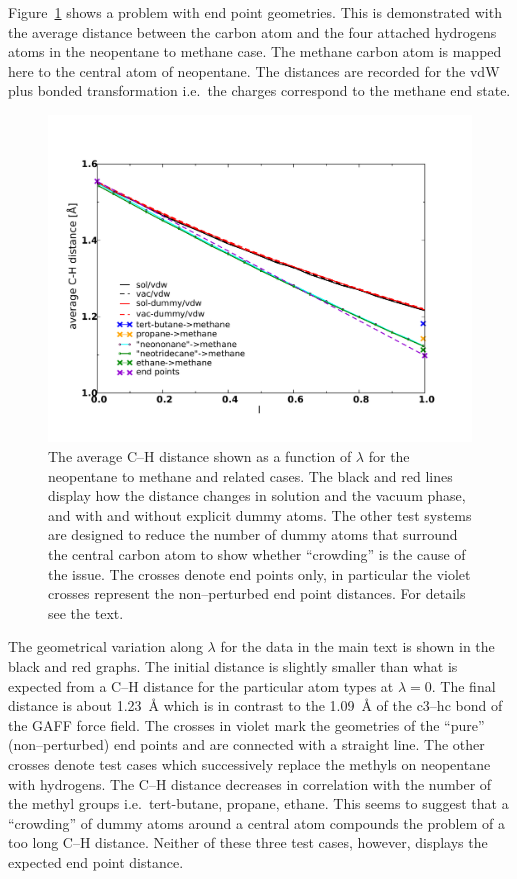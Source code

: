 \documentclass[journal=jctcce,manuscript=suppinfo]{achemso}
\begin{document}
Figure~\ref{fig:amber-dist} shows a problem with end point geometries.  This is demonstrated with the average distance between the
carbon atom and the four attached hydrogens atoms in the neopentane to
methane case.  The methane carbon atom is mapped here to the central atom
of neopentane.  The distances are recorded for the vdW plus bonded
transformation i.e.\ the charges correspond to the methane end state.
\begin{figure}[ht]
\includegraphics[scale=0.6]{figures/amber-dist.pdf}
\caption{The average C--H distance shown as a function of $\lambda$
  for the neopentane to methane and related cases.  The black and red
  lines display how the distance changes in solution and the
  vacuum phase, and with and without explicit dummy atoms.  The other test
  systems are designed to reduce the number of dummy atoms that
  surround the central carbon atom to show whether ``crowding'' is the
  cause of the issue.  The crosses denote end points only, in
  particular the violet crosses represent the non--perturbed end
  point distances.  For details see the text.}
\label{fig:amber-dist}
\end{figure}

The geometrical variation along $\lambda$ for the data in the main
text is shown in the black and red graphs.  The initial distance is
slightly smaller than what is expected from a C--H distance for the
particular atom types at $\lambda = 0$.  The final distance is about
\SI{1.23}{\angstrom} which is in contrast to the \SI{1.09}{\angstrom}
of the c3--hc bond of the GAFF force field.  The crosses in violet
mark the geometries of the ``pure'' (non--perturbed) end points and
are connected with a straight line.  The other crosses denote test
cases which successively replace the methyls on neopentane with
hydrogens.  The C--H distance decreases in correlation with the number
of the methyl groups i.e.\ tert-butane, propane, ethane.  This seems
to suggest that a ``crowding'' of dummy atoms around a central atom
compounds the problem of a too long C--H distance.  Neither of these
three test cases, however, displays the expected end point distance.
\end{document}
